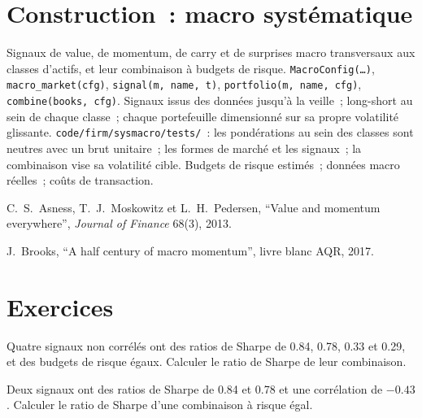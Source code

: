 \section{Construction~: macro systématique}\label{bld:s2:systematic-macro:sysmacro}

\begin{build}
 Signaux de value, de momentum, de carry et de surprises macro transversaux aux classes d'actifs, et leur combinaison à budgets de risque.
 \texttt{MacroConfig(\dots)}, \texttt{macro\_market(cfg)}, \texttt{signal(m, name, t)}, \texttt{portfolio(m, name, cfg)},
\texttt{combine(books, cfg)}.
 Signaux issus des données jusqu'à la veille~; long-short au sein de chaque classe~; chaque portefeuille dimensionné sur sa propre volatilité glissante.
 \texttt{code/firm/sysmacro/tests/}~: les pondérations au sein des classes sont neutres avec un brut unitaire~; les formes de marché et les signaux~; la
combinaison vise sa volatilité cible.
 Budgets de risque estimés~; données macro réelles~; coûts de transaction.
\end{build}

\begin{omsources}
\item C.~S.~Asness, T.~J.~Moskowitz et L.~H.~Pedersen, ``Value and momentum everywhere'', \emph{Journal of Finance} 68(3), 2013.
\item J.~Brooks, ``A half century of macro momentum'', livre blanc AQR, 2017.
\end{omsources}

\section{Exercices}

\begin{exercise}[$\star$]\label{exo:s2:systematic-macro:1}
Quatre signaux non corrélés ont des ratios de Sharpe de 0.84, 0.78, 0.33 et 0.29, et des budgets de risque égaux. Calculer le ratio de Sharpe de leur combinaison.
\end{exercise}

\begin{exercise}[$\star$]\label{exo:s2:systematic-macro:2}
Deux signaux ont des ratios de Sharpe de 0.84 et 0.78 et une corrélation de $-0.43$. Calculer le ratio de Sharpe d'une combinaison à risque égal.
\end{exercise}

